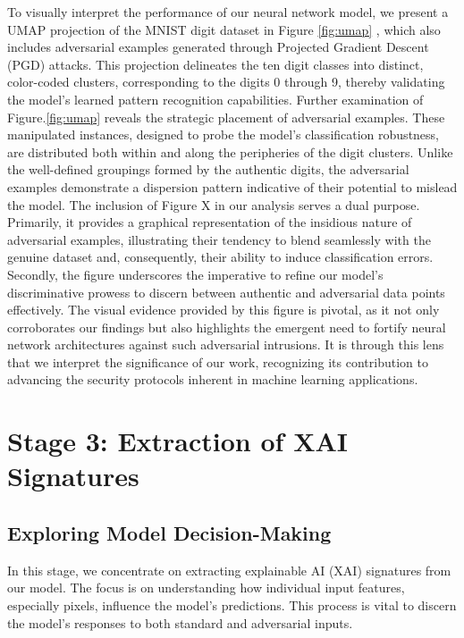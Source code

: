\documentclass[10pt, conference, a4paper, final]{IEEEtran}
\begin{document}
To visually interpret the performance of our neural network model, we present a UMAP \cite {McInnes.}projection of the MNIST digit dataset in Figure \ref {fig:umap} , which also includes adversarial examples generated through Projected Gradient Descent (PGD) attacks. This projection delineates the ten digit classes into distinct, color-coded clusters, corresponding to the digits 0 through 9, thereby validating the model's learned pattern recognition capabilities.
Further examination of Figure.\ref {fig:umap} reveals the strategic placement of adversarial examples. These manipulated instances, designed to probe the model's classification robustness, are distributed both within and along the peripheries of the digit clusters. Unlike the well-defined groupings formed by the authentic digits, the adversarial examples demonstrate a dispersion pattern indicative of their potential to mislead the model.
The inclusion of Figure X in our analysis serves a dual purpose. Primarily, it provides a graphical representation of the insidious nature of adversarial examples, illustrating their tendency to blend seamlessly with the genuine dataset and, consequently, their ability to induce classification errors. Secondly, the figure underscores the imperative to refine our model's discriminative prowess to discern between authentic and adversarial data points effectively.
The visual evidence provided by this figure is pivotal, as it not only corroborates our findings but also highlights the emergent need to fortify neural network architectures against such adversarial intrusions. It is through this lens that we interpret the significance of our work, recognizing its contribution to advancing the security protocols inherent in machine learning applications.
\section{Stage 3: Extraction of XAI Signatures}

\subsection{Exploring Model Decision-Making}
In this stage, we concentrate on extracting explainable AI (XAI) signatures from our model. The focus is on understanding how individual input features, especially pixels, influence the model's predictions. This process is vital to discern the model's responses to both standard and adversarial inputs.
\end{document}
